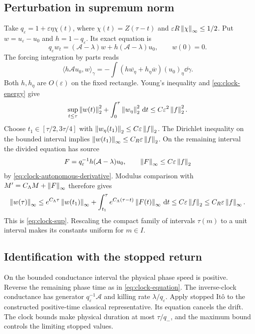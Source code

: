 \subsection{Perturbation in supremum norm}

Take $q_\varepsilon=1+\varepsilon\eta\chi(t)$, where
$\chi(t)=Z(\tau-t)$ and
$\varepsilon R\left\|\chi\right\|_\infty\le1/2$.
Put $w=u_\varepsilon-u_0$ and $h=1-q_\varepsilon$.
Its exact equation is
\[
 q_\varepsilon w_t=(\mathcal A-\lambda)w+
                          h(\mathcal A-\lambda)u_0,\qquad w(0)=0 .
\]
The forcing integration by parts reads
\[
 \langle h\mathcal A u_0,w\rangle_\gamma
   =-\int (h\overline{w_\eta}+h_\eta\overline w)
                       (u_0)_\eta\dd\gamma .
\]
Both $h,h_\eta$ are $O(\varepsilon)$ on the fixed rectangle.
Young's inequality and \eqref{eq:clock-energy} give
\begin{equation}\label{eq:clock-difference}
 \sup_{t\le\tau}\left\|w(t)\right\|_2^2+
           \int_0^\tau\left\|w_\eta\right\|_2^2\,\mathrm d t
       \le C\varepsilon^2\left\|f\right\|_2^2 .
\end{equation}
Choose $t_1\in[\tau/2,3\tau/4]$ with
$\left\|w_\eta(t_1)\right\|_2\le C\varepsilon\left\|f\right\|_2$.
The Dirichlet inequality on the bounded interval implies
$\left\|w(t_1)\right\|_\infty\le C_R\varepsilon\left\|f\right\|_2$.
On the remaining interval the divided equation has source
\[
 F=q_\varepsilon^{-1}h(\mathcal A-\lambda)u_0,\qquad
 \left\|F\right\|_\infty\le C\varepsilon\left\|f\right\|_2
\]
by \eqref{eq:clock-autonomous-derivative}. Modulus comparison
with $M'=C_\Lambda M+\left\|F\right\|_\infty$ therefore gives
\[
 \left\|w(\tau)\right\|_\infty
 \le e^{C_\Lambda\tau}\left\|w(t_1)\right\|_\infty+
       \int_{t_1}^\tau e^{C_\Lambda(\tau-t)}\left\|F(t)\right\|_\infty\,\mathrm d t
 \le C\varepsilon\left\|f\right\|_2
 \le C_R\varepsilon\left\|f\right\|_\infty .
\]
This is \eqref{eq:clock-sup}. Rescaling the compact family
of intervals $\tau(m)$ to a unit interval makes its
constants uniform for $m\in I$.

\subsection{Identification with the stopped return}

On the bounded conductance interval the physical phase speed
is positive. Reverse the remaining phase time as in
\eqref{eq:clock-equation}. The inverse-clock conductance has
generator $q_\varepsilon^{-1}\mathcal A$ and killing rate
$\lambda/q_\varepsilon$. Apply stopped It\^o to the
constructed positive-time classical representative.
Its equation cancels the drift. The clock bounds make
physical duration at most $\tau/q_-$, and the maximum
bound controls the limiting stopped values.

